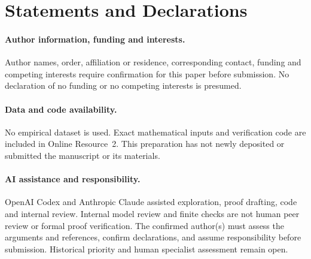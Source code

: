 \documentclass[11pt]{article}
\theoremstyle{remark}
\begin{document}
\section*{Statements and Declarations}
\paragraph{Author information, funding and interests.}
Author names, order, affiliation or residence, corresponding contact, funding
and competing interests require confirmation for this paper before submission.
No declaration of no funding or no competing interests is presumed.
\paragraph{Data and code availability.}
No empirical dataset is used. Exact mathematical inputs and verification code
are included in Online Resource~2. This preparation has not newly deposited
or submitted the manuscript or its materials.
\paragraph{AI assistance and responsibility.}
OpenAI Codex and Anthropic Claude assisted exploration, proof drafting,
code and internal review. Internal model review and finite checks are not
human peer review or formal proof verification. The confirmed author(s)
must assess the arguments and references, confirm declarations, and assume
responsibility before submission. Historical priority and human specialist
assessment remain open.
\end{document}
